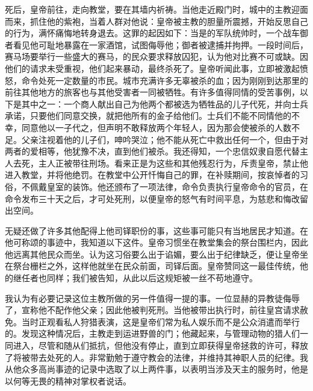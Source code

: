 死后，皇帝前往，走向教堂，要在其墙内祈祷。当他走近殿门时，城中的主教迎面而来，抓住他的紫袍，当着人群对他说：皇帝被主教的胆量所震撼，开始反思自己的行为，满怀痛悔地转身退去。这罪的起因如下：当是的军队统帅时，一个战车御者看见他可耻地暴露在一家酒馆，试图侮辱他；御者被逮捕并拘押。一段时间后，赛马场要举行一些盛大的赛马，的民众要求释放囚犯，认为他对比赛不可或缺。因他们的请求未受重视，他们起来暴动，最终杀死了。皇帝听闻此事，立即被激起愤怒，命令处死一定数量的市民。城市充满许多无辜被杀的血；因为刚刚到达那里的前往其他地方的旅客也与其他受害者一同被牺牲。有许多值得同情的受苦事例，以下是其中之一：一个商人献出自己为他两个都被选为牺牲品的儿子代死，并向士兵承诺，只要他们同意交换，就把他所有的金子给他们。士兵们不能不同情他的不幸，同意他以一子代之，但声明不敢释放两个年轻人，因为那会使被杀的人数不足。父亲注视着他的儿子们，呻吟哭泣；他不能从死亡中救出任何一个，但由于对两者的爱相等，他犹豫不决，直到他们被杀。我还得知，一个忠信奴隶自愿代替主人去死，主人正被带往刑场。看来正是为这些和其他残忍行为，斥责皇帝，禁止他进入教堂，并将他绝罚。在教堂中公开忏悔自己的罪，在补赎期间，按哀悼者的习俗，不佩戴皇室的装饰。他还颁布了一项法律，命令负责执行皇帝命令的官员，在命令发布三十天之后，才可处死刑，以便皇帝的怒气有时间平息，为慈悲和悔改留出空间。\par

无疑还做了许多其他配得上他司铎职份的事，这些事可能只有当地居民才知道。在他可称颂的事迹中，我知道以下这件。皇帝习惯坐在教堂集会的祭台围栏内，因此他远离其他民众而坐。认为这习俗要么出于谄媚，要么出于纪律缺乏，便让皇帝坐在祭台栅栏之外，这样他就坐在民众前面，司铎后面。皇帝赞同这一最佳传统，他的继任者也同样；我们被告知，从此以后这规矩被一丝不苟地遵守。\par

我认为有必要记录这位主教所做的另一件值得一提的事。一位显赫的异教徒侮辱了，宣称他不配作他父亲；因此他被判死刑。当他被带出执行时，前往皇宫请求赦免。当时正观看私人狩猎表演，这是皇帝们常为私人娱乐而不是公众消遣而举行的。发现这种情况后，主教走到运进野兽的门；他藏起来，与管理动物的猎人们一同进入，尽管和随从们抵抗，但他没有停止，直到立即获得皇帝拯救的许可，释放了将被带去处死的人。非常勤勉于遵守教会的法律，并维持其神职人员的纪律。我从他众多高尚事迹的记录中选取了以上两件事，以表明当涉及天主的服务时，他是以何等无畏的精神对掌权者说话。\par

